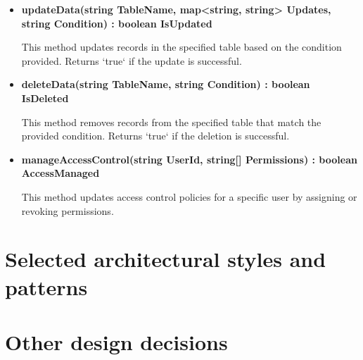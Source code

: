 \begin{itemize}
\begin{itemize}
\item \textbf{updateData(string TableName, map<string, string> Updates, string Condition) : boolean IsUpdated}

This method updates records in the specified table based on the condition provided. Returns `true` if the update is successful.

\item \textbf{deleteData(string TableName, string Condition) : boolean IsDeleted}  

This method removes records from the specified table that match the provided condition. Returns `true` if the deletion is successful.

\item \textbf{manageAccessControl(string UserId, string[] Permissions) : boolean AccessManaged}  

This method updates access control policies for a specific user by assigning or revoking permissions.

\end{itemize}
\end{itemize}


\section{Selected architectural styles and patterns}
\section{Other design decisions }
